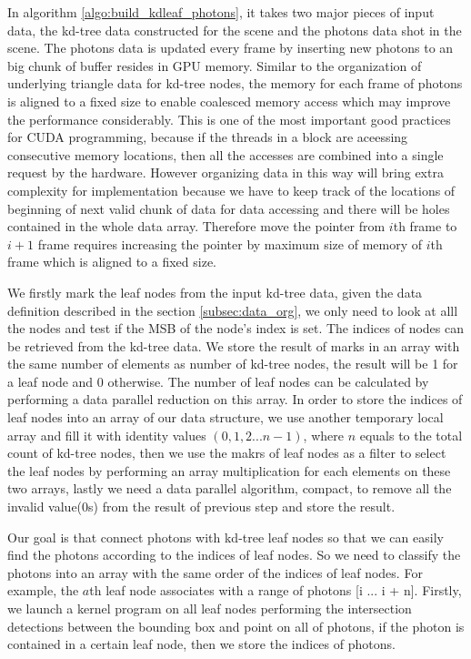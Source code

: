 In algorithm \ref{algo:build_kdleaf_photons}, it takes two major pieces of input data, the kd-tree data constructed for the scene and the photons data shot in the scene. The photons data is updated every frame by inserting new photons to an big chunk of buffer resides in GPU memory. Similar to the organization of underlying triangle data for kd-tree nodes, the memory for each frame of photons is aligned to a fixed size to enable coalesced memory access which may improve the performance considerably. This is one of the most important good practices for CUDA programming, because if the threads in a block are aceessing consecutive memory locations, then all the accesses are combined into a single request by the hardware. However organizing data in this way will bring extra complexity for implementation because we have to keep track of the locations of beginning of next valid chunk of data for data accessing and there will be holes contained in the whole data array. Therefore move the pointer from \(i\)th frame to \(i+1\) frame requires increasing the pointer by maximum size of memory of \(i\)th frame which is aligned to a fixed size. 

We firstly mark the leaf nodes from the input kd-tree data, given the data definition described in the section \ref{subsec:data_org}, we only need to look at alll the nodes and test if the MSB of the node's index is set. The indices of nodes can be retrieved from the kd-tree data. We store the result of marks in an array with the same number of elements as number of kd-tree nodes, the result will be 1 for a leaf node and 0 otherwise. The number of leaf nodes can be calculated by performing a data parallel reduction on this array. In order to store the indices of leaf nodes into an array of our data structure, we use another temporary local array and fill it with identity values \( (0, 1, 2 ... n-1) \), where \(n\) equals to the total count of kd-tree nodes, then we use the makrs of leaf nodes as a filter to select the leaf nodes by performing an array multiplication for each elements on these two arrays, lastly we need a data parallel algorithm, compact, to remove all the invalid value(0s) from the result of previous step and store the result. 

Our goal is that connect photons with kd-tree leaf nodes so that we can easily find the photons according to the indices of leaf nodes. So we need to classify the photons into an array with the same order of the indices of leaf nodes. For example, the \(a\)th leaf node associates with a range of photons [i ... i + n]. Firstly, we launch a kernel program on all leaf nodes performing the intersection detections between the bounding box and point on all of photons, if the photon is contained in a certain leaf node, then we store the indices of photons. 

